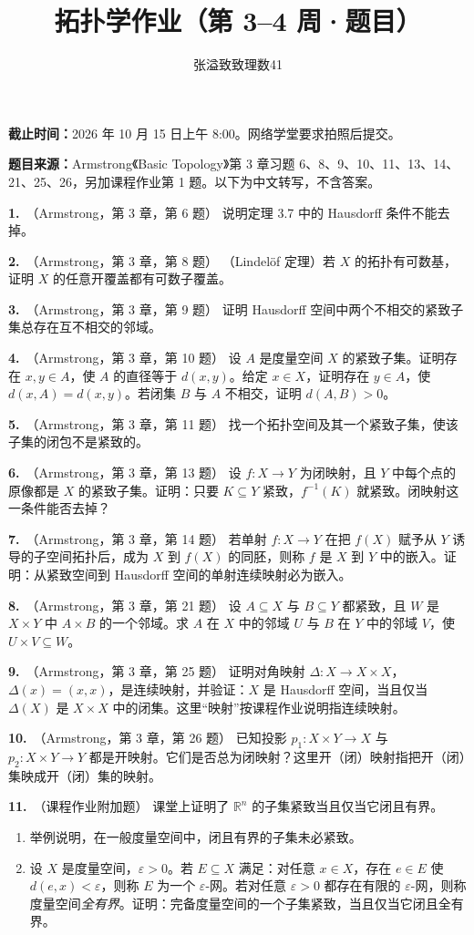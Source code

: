 \documentclass{article}
\title{拓扑学作业（第 3--4 周·题目）}
\author{张溢致\quad 致理数41\quad 2024011936}
\date{}
\newcommand{\R}{\mathbb R}
\newcommand{\problem}[2]{\par\medskip\noindent\textbf{#1.}\ （#2）\quad}
\begin{document}
\maketitle
\noindent\textbf{截止时间：}2026 年 10 月 15 日上午 8:00。网络学堂要求拍照后提交。\par
\noindent\textbf{题目来源：}Armstrong《Basic Topology》第 3 章习题 6、8、9、10、11、13、14、21、25、26，另加课程作业第 1 题。以下为中文转写，不含答案。

\problem{1}{Armstrong，第 3 章，第 6 题}
说明定理 3.7 中的 Hausdorff 条件不能去掉。

\problem{2}{Armstrong，第 3 章，第 8 题}
（Lindelöf 定理）若 $X$ 的拓扑有可数基，证明 $X$ 的任意开覆盖都有可数子覆盖。

\problem{3}{Armstrong，第 3 章，第 9 题}
证明 Hausdorff 空间中两个不相交的紧致子集总存在互不相交的邻域。

\problem{4}{Armstrong，第 3 章，第 10 题}
设 $A$ 是度量空间 $X$ 的紧致子集。证明存在 $x,y\in A$，使 $A$ 的直径等于 $d(x,y)$。给定 $x\in X$，证明存在 $y\in A$，使 $d(x,A)=d(x,y)$。若闭集 $B$ 与 $A$ 不相交，证明 $d(A,B)>0$。

\problem{5}{Armstrong，第 3 章，第 11 题}
找一个拓扑空间及其一个紧致子集，使该子集的闭包不是紧致的。

\problem{6}{Armstrong，第 3 章，第 13 题}
设 $f:X\to Y$ 为闭映射，且 $Y$ 中每个点的原像都是 $X$ 的紧致子集。证明：只要 $K\subseteq Y$ 紧致，$f^{-1}(K)$ 就紧致。闭映射这一条件能否去掉？

\problem{7}{Armstrong，第 3 章，第 14 题}
若单射 $f:X\to Y$ 在把 $f(X)$ 赋予从 $Y$ 诱导的子空间拓扑后，成为 $X$ 到 $f(X)$ 的同胚，则称 $f$ 是 $X$ 到 $Y$ 中的嵌入。证明：从紧致空间到 Hausdorff 空间的单射连续映射必为嵌入。

\problem{8}{Armstrong，第 3 章，第 21 题}
设 $A\subseteq X$ 与 $B\subseteq Y$ 都紧致，且 $W$ 是 $X\times Y$ 中 $A\times B$ 的一个邻域。求 $A$ 在 $X$ 中的邻域 $U$ 与 $B$ 在 $Y$ 中的邻域 $V$，使 $U\times V\subseteq W$。

\problem{9}{Armstrong，第 3 章，第 25 题}
证明对角映射 $\Delta:X\to X\times X$，$\Delta(x)=(x,x)$，是连续映射，并验证：$X$ 是 Hausdorff 空间，当且仅当 $\Delta(X)$ 是 $X\times X$ 中的闭集。这里“映射”按课程作业说明指连续映射。

\problem{10}{Armstrong，第 3 章，第 26 题}
已知投影 $p_1:X\times Y\to X$ 与 $p_2:X\times Y\to Y$ 都是开映射。它们是否总为闭映射？这里开（闭）映射指把开（闭）集映成开（闭）集的映射。

\problem{11}{课程作业附加题}
课堂上证明了 $\R^n$ 的子集紧致当且仅当它闭且有界。
\begin{enumerate}
\item 举例说明，在一般度量空间中，闭且有界的子集未必紧致。
\item 设 $X$ 是度量空间，$\varepsilon>0$。若 $E\subseteq X$ 满足：对任意 $x\in X$，存在 $e\in E$ 使 $d(e,x)<\varepsilon$，则称 $E$ 为一个 $\varepsilon$-网。若对任意 $\varepsilon>0$ 都存在有限的 $\varepsilon$-网，则称度量空间\emph{全有界}。证明：完备度量空间的一个子集紧致，当且仅当它闭且全有界。
\end{enumerate}
\end{document}
